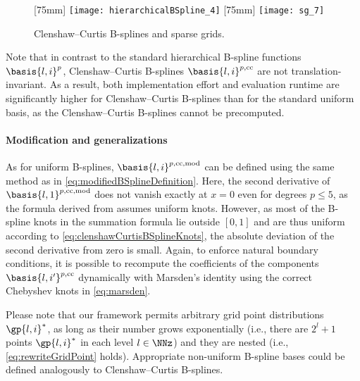 \begin{figure}
  [75mm]{%
    \texttt{[image: hierarchicalBSpline\_4]}%
  }%
  \hfill%
  [75mm]{%
    \texttt{[image: sg\_7]}%
  }%
  \caption{%
    Clenshaw--Curtis B-splines and sparse grids.%
  }
  \label{fig:clenshawCurtis}
\end{figure}

Note that in contrast to the standard hierarchical B-spline functions
$\basis{l,i}^p$, Clenshaw--Curtis B-splines
$\basis{l,i}^{p,\clenshawcurtis}$ are not translation-invariant.
As a result, both implementation effort and evaluation runtime
are significantly higher for Clenshaw--Curtis B-splines than
for the standard uniform basis,
as the Clenshaw--Curtis B-splines cannot be precomputed.

\paragraph{Modification and generalizations}

As for uniform B-splines,
$\basis{l,i}^{p,\clenshawcurtis,\modified}$ can be defined using the
same method as in \eqref{eq:modifiedBSplineDefinition}.
Here, the second derivative of $\basis{l,1}^{p,\clenshawcurtis,\modified}$
does not vanish exactly at $x = 0$ even for degrees $p \le 5$,
as the formula derived from  assumes uniform knots.
However, as most of the B-spline knots in the summation formula
lie outside $[0, 1]$ and are thus uniform according
to \eqref{eq:clenshawCurtisBSplineKnots},
the absolute deviation of the second derivative from zero is small.
Again, to enforce natural boundary conditions,
it is possible to recompute the coefficients
of the components $\basis{l,i'}^{p,\clenshawcurtis}$
dynamically with Marsden's identity using the correct Chebyshev knots
in \eqref{eq:marsden}.

Please note that our framework permits arbitrary grid point distributions
$\gp{l,i}^\ast$,
as long as their number grows exponentially
(i.e., there are $2^l + 1$ points $\gp{l,i}^\ast$ in each level $l \in \NNz$)
and they are nested
(i.e., \eqref{eq:rewriteGridPoint} holds).
Appropriate non-uniform B-spline bases could be defined analogously
to Clenshaw--Curtis B-splines.
